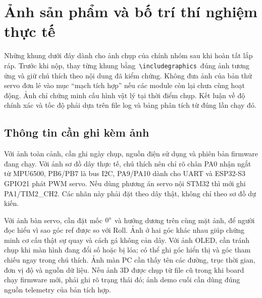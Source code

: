 \section{Ảnh sản phẩm và bố trí thí nghiệm thực tế}
Những khung dưới đây dành cho ảnh chụp của chính nhóm sau khi hoàn tất lắp ráp. Trước khi nộp, thay từng khung bằng \,\texttt{\textbackslash includegraphics}\, đúng ảnh tương ứng và giữ chú thích theo nội dung đã kiểm chứng. Không đưa ảnh của bản thử servo đơn lẻ vào mục ``mạch tích hợp'' nếu các module còn lại chưa cùng hoạt động. Ảnh chỉ chứng minh cấu hình vật lý tại thời điểm chụp. Kết luận về độ chính xác và tốc độ phải dựa trên file log và bảng phân tích từ đúng lần chạy đó.







\subsection{Thông tin cần ghi kèm ảnh}
Với ảnh toàn cảnh, cần ghi ngày chụp, nguồn điện sử dụng và phiên bản firmware đang chạy. Với ảnh sơ đồ dây thực tế, chú thích nên chỉ rõ chân PA0 nhận ngắt từ MPU6500, PB6/PB7 là bus I2C, PA9/PA10 dành cho UART và ESP32-S3 GPIO21 phát PWM servo. Nếu dùng phương án servo nội STM32 thì mới ghi PA1/TIM2\_CH2. Các nhãn này phải đặt theo dây thật, không chỉ theo sơ đồ dự kiến.

Với ảnh bàn servo, cần đặt mốc $0^{\circ}$ và hướng dương trên cùng mặt ảnh, để người đọc hiểu vì sao góc ref được so với Roll. Ảnh ở hai góc khác nhau giúp chứng minh cơ cấu thật sự quay và cách gá không cản dây. Với ảnh OLED, cần tránh chụp khi màn hình đang đổi số hoặc bị lóa; có thể ghi góc hiển thị và góc tham chiếu ngay trong chú thích. Ảnh màn PC cần thấy tên các đường, trục thời gian, đơn vị độ và nguồn dữ liệu. Nếu ảnh 3D được chụp từ file cũ trong khi board chạy firmware mới, phải ghi rõ trạng thái đó; ảnh demo cuối cần dùng đúng nguồn telemetry của bản tích hợp.

